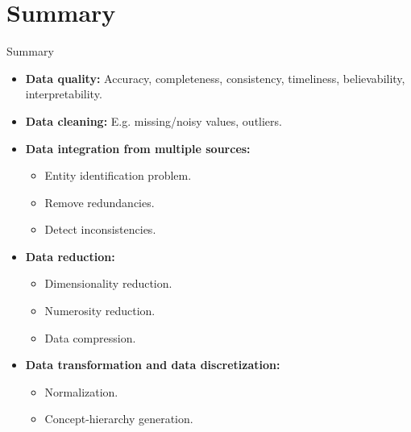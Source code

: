 \section{Summary}

\begin{frame}{Summary}
	\begin{itemize}
		\item \textbf{Data quality:} Accuracy, completeness, consistency, 
		timeliness, believability, interpretability.
		\item \textbf{Data cleaning:} E.g. missing/noisy values, outliers.
		\item \textbf{Data integration from multiple sources:}
		\begin{itemize}
			\item Entity identification problem.
			\item Remove redundancies.
			\item Detect inconsistencies.
		\end{itemize}
		\item \textbf{Data reduction:}
		\begin{itemize}
			\item Dimensionality reduction.
			\item Numerosity reduction.
			\item Data compression.
		\end{itemize}
		\item \textbf{Data transformation and data discretization:}
		\begin{itemize}
			\item Normalization.
			\item Concept-hierarchy generation.
		\end{itemize}
	\end{itemize}
\end{frame}